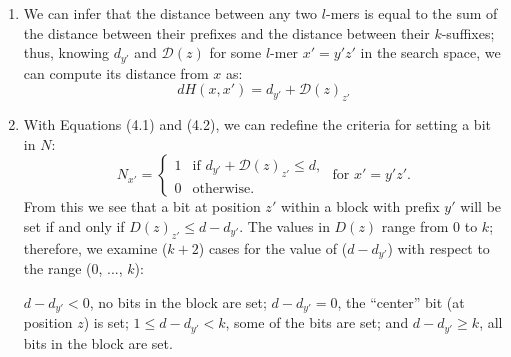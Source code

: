 \documentclass[oneside,12pt]{DISCSthesis}
\begin{document}
{\begin{enumerate}
				{\small\hspace*{40pt} Ex.\ \ \ \ For the block containing $l$-mers \{\texttt{acgttgcaaaaa} to \texttt{acgttgcttttt}\},
				\newline\hspace*{70pt} the prefix distance from $z$ = \texttt{acgtacgtacgt} is 
				\newline\hspace*{70pt} $d_{y'} = dH(\texttt{acgtacg}, \texttt{acgttgc}) = 3.$
				}

			\item We can infer that the distance between any two $l$-mers is equal to the sum of the distance between their prefixes and the distance between their $k$-suffixes; %
			thus, knowing $d_{y'}$ and $\mathcal{D}(z)$ for some $l$-mer $x' = y'z'$ in the search space, we can compute its distance from $x$ as:
				\begin{equation}
					dH(x,x') = d_{y'} + \mathcal{D}(z)_{z'}
					\end{equation}

			\item With Equations (4.1) and (4.2), we can redefine the criteria for setting a bit in $N$:
				\begin{equation}
					N_{x'} = \left\{
					\begin{array}{rl}
						1 & \text{if } d_{y'} + \mathcal{D}(z)_{z'} \leq d,\\
						0 & \text{otherwise.}%
					\end{array} \right.
					\text{ for }x' = y'z'.
					\end{equation}
				From this we see that a bit at position $z'$ within a block with prefix $y'$ will be set if and only if $D(z)_{z'} \leq d-d_{y'}$. The values in $D(z)$ range from 0 to $k$; therefore, we examine ($k + 2$) cases for the value of ($d - d_{y'}$) with respect to the range (0, ..., $k$):

					{\small
					\hspace*{40pt}{\bf\boldmath Case $-1$:}
					\hspace*{54pt} $d-d_{y'} < 0$, \hspace*{24pt}no bits in the block are set;\newline
					\hspace*{40pt}{\bf\boldmath Case 0:}
					\hspace*{66pt} $d-d_{y'} = 0$, \hspace*{24pt}the ``center'' bit (at position $z$) is set;\newline
					\hspace*{40pt}{\bf\boldmath\boldmath Cases 1 to $k-1$:}
					\hspace*{11.5pt} $1 \leq d-d_{y'} < k$, \hspace*{5pt}some of the bits are set; and\newline
					\hspace*{40pt}{\bf\boldmath Case $k$:}
					\hspace*{66pt}$d-d_{y'} \geq k$, \hspace*{24pt}all bits in the block are set.}


\end{enumerate}}
\end{document}
